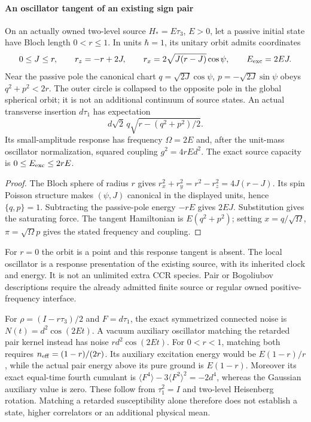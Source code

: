\documentclass[12pt,a4paper]{article}
\begin{document}
\paragraph{An oscillator tangent of an existing sign pair}
\begin{proposition}
\label{p4:prop:v2209-compact-bloch-source}
On an actually owned two-level source \(H_*=E\tau_3\), \(E>0\), let a
passive initial state have Bloch length \(0<r\le1\). In units \(\hbar=1\),
its unitary orbit admits coordinates
\[
 0\le J\le r,\qquad r_z=-r+2J,\qquad
 r_x=2\sqrt{J(r-J)}\cos\psi,\qquad E_{\rm exc}=2EJ.
\]
Near the passive pole the canonical chart
\(q=\sqrt{2J}\cos\psi\), \(p=-\sqrt{2J}\sin\psi\) obeys
\(q^2+p^2<2r\). The outer circle is collapsed to the opposite pole in the
global spherical orbit; it is not an additional continuum of source states.
An actual transverse insertion \(d\tau_1\) has expectation
\[
 d\sqrt2\,q\sqrt{r-(q^2+p^2)/2}.
\]
Its small-amplitude response has frequency \(\Omega=2E\) and, after the
unit-mass oscillator normalization, squared coupling \(g^2=4rEd^2\).
The exact source capacity is \(0\le E_{\rm exc}\le2rE\).
\end{proposition}
\begin{proof}
The Bloch sphere of radius \(r\) gives
\(r_x^2+r_y^2=r^2-r_z^2=4J(r-J)\). Its spin Poisson structure makes
\((\psi,J)\) canonical in the displayed units, hence \(\{q,p\}=1\).
Subtracting the passive-pole energy \(-rE\) gives \(2EJ\).
Substitution gives the saturating force. The tangent Hamiltonian is
\(E(q^2+p^2)\); setting \(x=q/\sqrt\Omega\),
\(\pi=\sqrt\Omega p\) gives the stated frequency and coupling.
\end{proof}
For \(r=0\) the orbit is a point and this response tangent is absent.
The local oscillator is a response presentation of the existing source,
with its inherited clock and energy. It is not an unlimited extra CCR
species. Pair or Bogoliubov descriptions require the already admitted
finite source or regular owned positive-frequency interface.

\begin{remark}
\label{p4:rem:v2209-noise-energy-witness}
For \(\rho=(I-r\tau_3)/2\) and \(F=d\tau_1\), the exact symmetrized
connected noise is \(N(t)=d^2\cos(2Et)\). A vacuum auxiliary oscillator
matching the retarded pair kernel instead has noise \(rd^2\cos(2Et)\).
For \(0<r<1\), matching both requires
\(n_{\rm eff}=(1-r)/(2r)\). Its auxiliary excitation energy would be
\(E(1-r)/r\), while the actual pair energy above its pure ground is
\(E(1-r)\). Moreover its exact equal-time fourth cumulant is
\(\langle F^4\rangle-3\langle F^2\rangle^2=-2d^4\), whereas the Gaussian
auxiliary value is zero. These follow from \(\tau_1^2=I\) and two-level
Heisenberg rotation. Matching a retarded susceptibility alone therefore
does not establish a state, higher correlators or an additional physical mean.
\end{remark}
\end{document}
